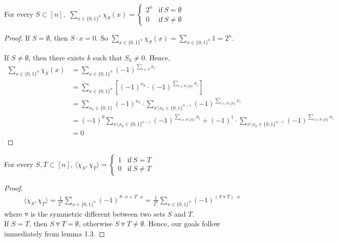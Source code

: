 \begin{lemma}
For every $S \subset [n],$ \center
$\sum\limits_{x \in \{ 0, 1 \}^n} \chi_S(x) =
\begin{cases}
2^n      & \text{if} \ S = \emptyset \\
0        & \text{if} \ S \neq \emptyset
\end{cases}$
\end{lemma}

\begin{proof}
If $ S = \emptyset $, then $S \cdot x = 0$. So $\sum\limits_{x \in \{ 0, 1 \}^n} \chi_S(x) = \sum \limits_{x \in \{ 0, 1 \}^n} 1 = 2^n $.

If $S \neq \emptyset$, then there exists $k$ such that $S_k \neq 0$. Hence, \\
\begin{align*}
\sum\limits_{x \in \{ 0, 1 \}^n} \chi_S(x) 
& = \sum\limits_{x \in \{ 0, 1 \}^n} (-1)^{\sum \limits_{i \in S} x_i} \\
& = \sum\limits_{x \in \{ 0, 1 \}^n} [(-1)^{x_k} \cdot (-1)^{\sum\limits_{i \in S \setminus \{k \}} x_i}] \\
& = \sum\limits_{x_k \in \{0, 1 \} }(-1)^{x_k} 
\cdot \sum\limits_{x \setminus x_k \in \{0,1\}^{n-1}} (-1)^{\sum\limits_{i \in S \setminus \{k \}} x_i}  \\
& = (-1)^0 \sum\limits_{x \setminus x_k \in \{0,1\}^{n-1}} (-1)^{\sum\limits_{i \in S \setminus \{k \}} x_i} + (-1)^1 \cdot \sum\limits_{x \setminus x_k \in \{0,1\}^{n-1}} (-1)^{\sum\limits_{i \in S \setminus \{k \}} x_i} \\
& = 0
\end{align*}
\end{proof}

\begin{theorem}
For every $S, T \subset [n]$,
\center
$\langle \chi_S, \chi_T \rangle =
\begin{cases}
1      & \text{if} \ S = T \\
0      & \text{if} \ S \neq T
\end{cases}$
\end{theorem}

\begin{proof}
\begin{align*}
\langle \chi_S, \chi_T \rangle 
= \frac{1}{2^n}  \sum\limits_{x \in \{0,1\}^n} (-1)^{S \cdot x + T \cdot x}
= \frac{1}{2^n}  \sum\limits_{x \in \{0,1\}^n} (-1)^{(S \triangledown T) \cdot x}
\end{align*}
where $\triangledown$ is the symmetric different between two sets $S$ and $T$. \\
If $S = T$, then $S \triangledown T = \emptyset$, otherwise $S \triangledown T \neq \emptyset$. Hence, our goals follow immediately from lemma 1.3.
\end{proof}


